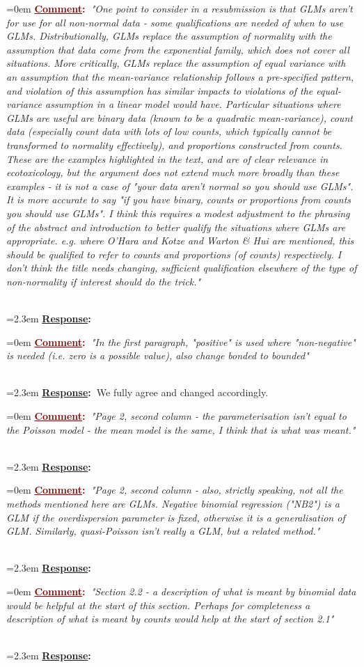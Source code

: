 \documentclass[12pt]{article}
\newcommand{\comment}[1]{
	\vspace{2em} \noindent \hangindent=0em \textbf{\textcolor{Maroon}{\uline{Comment}:~}}\emph{"#1"}
	}
\newcommand{\response}[1]{
	\\[0.25em] 
	\hangindent=2.3em \textbf{\textcolor{NavyBlue}{\uline{Response}:~}}#1 
	}
\begin{document}
\comment{One point to consider in a resubmission is that GLMs aren't for use for all non-normal data - some qualifications are needed of when to use GLMs.  Distributionally, GLMs replace the assumption of normality with the assumption that data come from the exponential family, which does not cover all situations.  More critically, GLMs replace the assumption of equal variance with an assumption that the mean-variance relationship follows a pre-specified pattern, and violation of this assumption has similar impacts to violations of the equal-variance assumption in a linear model would have.  Particular situations where GLMs are useful are binary data (known to be a quadratic mean-variance), count data (especially count data with lots of low counts, which typically cannot be transformed to normality effectively), and proportions constructed from counts.  These are the examples highlighted in the text, and are of clear relevance in ecotoxicology, but the argument does not extend much
more broadly than these examples - it is not a case of "your data aren't normal so you should use GLMs".  It is more accurate to say "if you have binary, counts or proportions from counts you should use GLMs".  I think this requires a modest adjustment to the phrasing of the abstract and introduction to better qualify the situations where GLMs are appropriate.  e.g. where O'Hara and Kotze and Warton \& Hui are mentioned, this should be qualified to refer to counts and proportions (of counts) respectively.  I  don't think the title needs changing, sufficient qualification elsewhere of the type of non-normality if interest should do the trick.}
\response{}

\comment{In the first paragraph, "positive" is used where "non-negative" is needed (i.e. zero is a possible value), also change bonded to bounded}
\response{We fully agree and changed accordingly.}

\comment{Page 2, second column - the parameterisation isn't equal to the Poisson model - the mean model is the same, I think that is what was meant.}
\response{} 

\comment{Page 2, second column - also, strictly speaking, not all the methods mentioned here are GLMs.  Negative binomial regression ("NB2") is a GLM if the overdispersion parameter is fixed, otherwise it is a generalisation of GLM.  Similarly, quasi-Poisson isn't really a GLM, but a related method.}
\response{}

\comment{Section 2.2 - a description of what is meant by binomial data would be helpful at the start of this section.  Perhaps for completeness a description of what is meant by counts would help at the start of section 2.1}
\response{}
\end{document}
